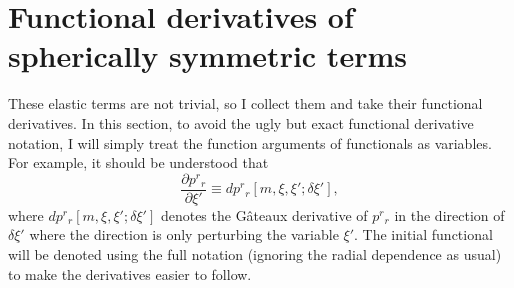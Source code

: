 \section{Functional derivatives of spherically symmetric terms}
These elastic terms are not trivial, so I collect them and take their functional derivatives. In this section, to avoid the ugly but exact functional derivative notation, I will simply treat the function arguments of functionals as variables. For example, it should be understood that
\begin{equation}
\frac{\partial p^r{}_r}{\partial \xi'} \equiv dp^r{}_r[m,\xi,\xi';\delta\xi'],
\label{eq:functionalDerivativeNotation}
\end{equation}
where $dp^r{}_r[m,\xi,\xi';\delta\xi']$ denotes the G\^ateaux derivative of $p^r{}_r$ in the direction of $\delta\xi'$ where the direction is only perturbing the variable $\xi'$. The initial functional will be denoted using the full notation (ignoring the radial dependence as usual) to make the derivatives easier to follow.

